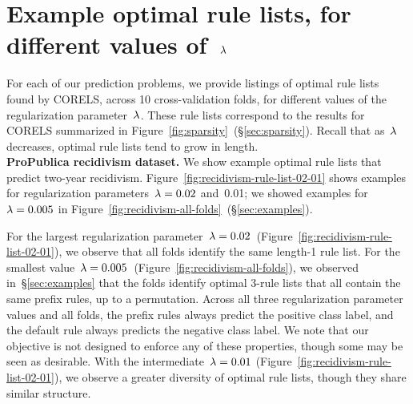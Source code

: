\section{Example optimal rule lists, for different values of~${\lambda}$}
\label{appendix:examples}

For each of our prediction problems, we provide listings of
optimal rule lists found by CORELS, across 10 cross-validation folds,
for different values of the regularization parameter~${\lambda}$.
%
These rule lists correspond to the results for CORELS summarized
in Figure~\ref{fig:sparsity}~(\S\ref{sec:sparsity}).
%
Recall that as~${\lambda}$ decreases, optimal rule lists tend to grow in length. \\

\textbf{ProPublica recidivism dataset.}
We show example optimal rule lists that predict two-year recidivism.
%
Figure~\ref{fig:recidivism-rule-list-02-01} shows examples for
regularization parameters~${{\lambda} = 0.02}$ and~0.01;
we showed examples for~${{\lambda} = 0.005}$ in
Figure~\ref{fig:recidivism-all-folds}~(\S\ref{sec:examples}).

For the largest regularization parameter~${{\lambda} = 0.02}$~(Figure~\ref{fig:recidivism-rule-list-02-01}),
we observe that all folds identify the same length-1 rule list.
%
For the smallest value~${{\lambda} = 0.005}$~(Figure~\ref{fig:recidivism-all-folds}),
we observed in~\S\ref{sec:examples} that the folds identify
optimal 3-rule lists that all contain the same prefix rules, up to a permutation.
%
Across all three regularization parameter values and all folds,
the prefix rules always predict the positive class label,
and the default rule always predicts the negative class label.
%
We note that our objective is not designed to enforce any of these properties,
though some may be seen as desirable.
%
With the intermediate~${{\lambda} = 0.01}$ (Figure~\ref{fig:recidivism-rule-list-02-01}),
we observe a greater diversity of optimal rule lists, though they share similar structure.

